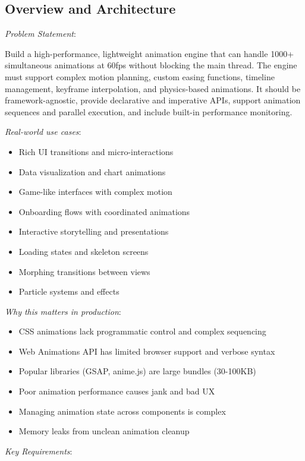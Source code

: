 \documentclass[11pt]{article}
\begin{document}
\subsection{Overview and Architecture}
\label{sec:org9606642}

\emph{Problem Statement}:

Build a high-performance, lightweight animation engine that can handle 1000+ simultaneous animations at 60fps without blocking the main thread. The engine must support complex motion planning, custom easing functions, timeline management, keyframe interpolation, and physics-based animations. It should be framework-agnostic, provide declarative and imperative APIs, support animation sequences and parallel execution, and include built-in performance monitoring.

\emph{Real-world use cases}:

\begin{itemize}
\item Rich UI transitions and micro-interactions
\item Data visualization and chart animations
\item Game-like interfaces with complex motion
\item Onboarding flows with coordinated animations
\item Interactive storytelling and presentations
\item Loading states and skeleton screens
\item Morphing transitions between views
\item Particle systems and effects
\end{itemize}

\emph{Why this matters in production}:

\begin{itemize}
\item CSS animations lack programmatic control and complex sequencing
\item Web Animations API has limited browser support and verbose syntax
\item Popular libraries (GSAP, anime.js) are large bundles (30-100KB)
\item Poor animation performance causes jank and bad UX
\item Managing animation state across components is complex
\item Memory leaks from unclean animation cleanup
\end{itemize}

\emph{Key Requirements}:
\end{document}
